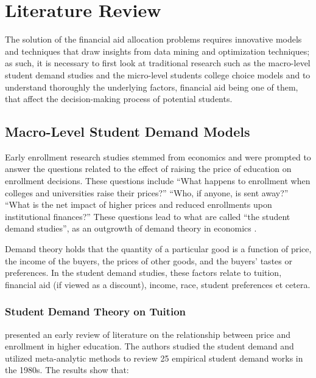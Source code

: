 \documentclass[12pt,english]{report}
\begin{document}
\chapter{Literature Review}
The solution of the financial aid allocation problems requires innovative models and techniques that draw insights from data mining and optimization techniques; as such, it is necessary to first look at traditional research such as the macro-level student demand studies and the micro-level students college choice models and to understand  thoroughly the underlying factors, financial aid being one of them, that affect the decision-making process of potential students.

\section{Macro-Level Student Demand Models}
Early enrollment research studies stemmed from economics and were prompted to answer the questions related to the effect of raising the price of education on enrollment decisions. These questions include  ``What happens to enrollment when colleges and universities raise their prices?''  ``Who, if anyone, is sent away?''  ``What is the net impact of higher prices and reduced enrollments upon institutional finances?''  These questions  lead to what are called ``the student demand studies'', as an outgrowth of demand theory in economics \citep{Leslie1987,  Leslie1988, Heller1997, Ehrenberg2004, Crouse2015}.

Demand theory holds that the quantity of a particular good is a function of price, the income of the buyers, the prices of other goods, and the buyers' tastes or preferences. In the student demand studies, these factors relate to tuition, financial aid (if viewed as a discount), income, race, student preferences et cetera.

\subsection{Student Demand Theory on Tuition}
\citet{Leslie1987} presented an early review of literature on the relationship between price and enrollment in higher education. The authors studied the student demand and utilized meta-analytic methods to review 25 empirical student demand works in the 1980s. The results show that:
\end{document}
